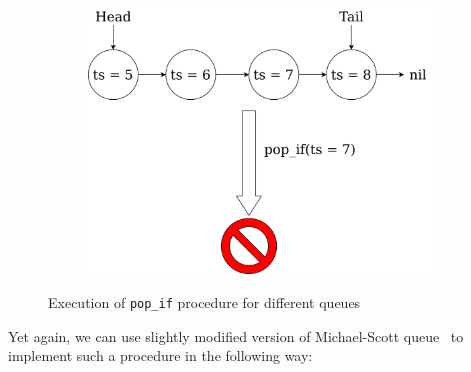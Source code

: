 \documentclass[times, dvipsnames,%
               languages={russian,english} %
              ]{itmo-student-thesis}
\begin{document}
\begin{figure}[H]
\begin{subfigure}[b]{0.45\linewidth}
          \label{pop-if-not-remove-pic}
     \end{subfigure}
     \hfill
     \begin{subfigure}[b]{0.45\linewidth}
          \centering
          \includegraphics[width=\linewidth]{pics/pop-if-invalid.png}
          \label{pop-if-invalid-pic}
     \end{subfigure}
    \caption{Execution of \texttt{pop\_if} procedure for different queues}
    \label{pop-if-pics}
\end{figure}

Yet again, we can use slightly modified version of Michael-Scott queue~\cite{michael1996simple} to implement such a procedure in the following way:
\end{document}
